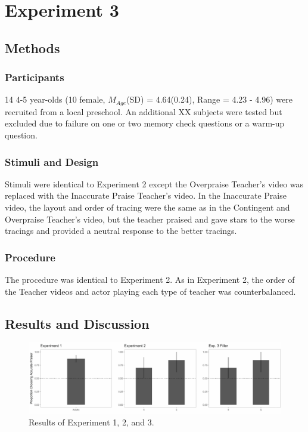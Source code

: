 \documentclass[10pt, letterpaper]{article}
\newenvironment{CodeChunk}{}{}
\begin{document}
\section{Experiment 3}\label{experiment-3}

\subsection{Methods}\label{methods-2}

\subsubsection{Participants}\label{participants-2}

14 4-5 year-olds (10 female, \(M_{Age}\)(SD) = 4.64(0.24), Range = 4.23
- 4.96) were recruited from a local preschool. An additional XX subjects
were tested but excluded due to failure on one or two memory check
questions or a warm-up question.

\subsubsection{Stimuli and Design}\label{stimuli-and-design}

Stimuli were identical to Experiment 2 except the Overpraise Teacher's
video was replaced with the Inaccurate Praise Teacher's video. In the
Inaccurate Praise video, the layout and order of tracing were the same
as in the Contingent and Overpraise Teacher's video, but the teacher
praised and gave stars to the worse tracings and provided a neutral
response to the better tracings.

\subsubsection{Procedure}\label{procedure-2}

The procedure was identical to Experiment 2. As in Experiment 2, the
order of the Teacher videos and actor playing each type of teacher was
counterbalanced.

\subsection{Results and Discussion}\label{results-and-discussion-2}

\begin{CodeChunk}
\begin{figure}[h]

{\centering \includegraphics{figs/results_adult-1} 

}

\caption[Results of Experiment 1, 2, and 3]{Results of Experiment 1, 2, and 3.}\label{fig:results_adult}
\end{figure}
\end{CodeChunk}
\end{document}
